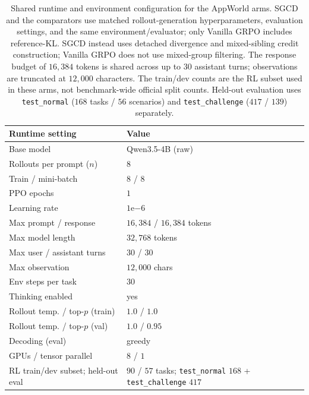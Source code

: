\begin{table}[h]
  \centering
  \venuecompacttablefont
  \setlength{\tabcolsep}{3pt}
  \begin{tabular}{p{}p{}}
    \hline
    \textbf{Runtime setting} & \textbf{Value} \\
    \hline
    Base model                  & Qwen3.5-4B (raw) \\
    Rollouts per prompt ($n$)   & $8$ \\
    Train / mini-batch          & $8$ / $8$ \\
    PPO epochs                  & $1$ \\
    Learning rate               & $1\mathrm{e}{-6}$ \\
    Max prompt / response       & $16{,}384$ / $16{,}384$ tokens \\
    Max model length            & $32{,}768$ tokens \\
    Max user / assistant turns  & $30$ / $30$ \\
    Max observation             & $12{,}000$ chars \\
    Env steps per task          & $30$ \\
    Thinking enabled            & yes \\
    Rollout temp. / top-$p$ (train) & $1.0$ / $1.0$ \\
    Rollout temp. / top-$p$ (val)   & $1.0$ / $0.95$ \\
    Decoding (eval)             & greedy \\
    GPUs / tensor parallel      & $8$ / $1$ \\
    RL train/dev subset; held-out eval & $90$ / $57$ tasks; \texttt{test\_normal} $168$ + \texttt{test\_challenge} $417$ \\
    \hline
  \end{tabular}
  \caption{Shared runtime and environment configuration for the AppWorld arms.
    SGCD and the comparators use matched rollout-generation hyperparameters,
    evaluation settings, and the same environment/evaluator; only Vanilla GRPO
    includes reference-KL. SGCD
    instead uses detached divergence and mixed-sibling credit construction;
    Vanilla GRPO does not use mixed-group filtering. The response budget of $16{,}384$ tokens
    is shared across up to $30$ assistant turns; observations are truncated at
    $12{,}000$ characters. The train/dev counts are the RL subset used in these
    arms, not benchmark-wide official split counts. Held-out evaluation uses
    \texttt{test\_normal} ($168$ tasks / $56$ scenarios) and
    \texttt{test\_challenge} ($417$ / $139$) separately.}
  \label{tab:recipe}
\end{table}

